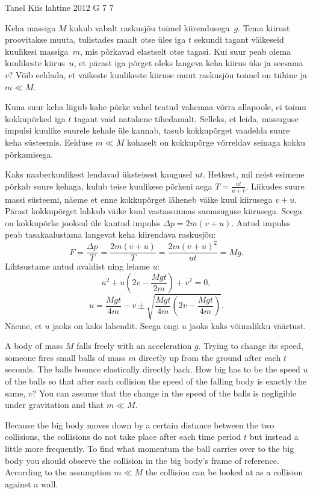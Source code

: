 {Tanel Kiis} %
{lahtine} %
{2012} %
{G 7} %
{7} %
{
\ifStatement
Keha massiga $M$ kukub vabalt raskusjõu toimel kiirendusega~$g$. Tema
kiirust proovitakse muuta, tulistades maalt otse üles iga $t$ sekundi tagant
väikeseid kuulikesi massiga~$m$, mis põrkavad elastselt otse tagasi.
Kui suur peab olema kuulikeste kiirus~$u$, et pärast iga põrget oleks langeva
keha kiirus üks ja seesama~$v$? Võib eeldada, et väikeste kuulikeste kiiruse muut raskusjõu toimel on
tühine ja $m\ll M$.
\fi


\ifHint
Kuna suur keha liigub kahe põrke vahel teatud vahemaa võrra allapoole, ei toimu kokkupõrked iga $t$ tagant vaid natukene tihedamalt. Selleks, et leida, missuguse impulsi kuulike suurele kehale üle kannab, tasub kokkupõrget vaadelda suure keha süsteemis. Eelduse $m\ll M$ kohaselt on kokkupõrge võrreldav seinaga kokku põrkamisega.
\fi


\ifSolution
Kaks naaberkuulikest lendavad üksteisest kaugusel $u t$. Hetkest, mil neist esimene põrkab suure kehaga, kulub teise kuulikese põrkeni aega $T=\frac{u t}{u+v}$.
Liikudes suure massi süsteemi, näeme et enne kokkupõrget läheneb väike kuul kiirusega $v + u$. Pärast kokkupõrget lahkub väike kuul vastassuunas samasuguse kiirusega. Seega on kokkupõrke jooksul üle kantud impulss $\Delta p = 2m(v + u)$. Antud impulss peab tasakaalustama langevat keha kiirendava raskusjõu: \[ F=\frac{\Delta p}{T}=\frac{2m(v + u)}{T} = \frac{2m(v + u)^2}{ut}=Mg. \]
Lihtsustame antud avaldist ning leiame $u$:
\[
u^2 + u\left( 2v - \frac{Mgt}{2m}\right) + v^2 = 0,
\]
\[
u = \frac{Mgt}{4m} - v \pm \sqrt{\frac{Mgt}{4m}\left( 2v - \frac{Mgt}{4m}\right)}.
\]
Näeme, et $u$ jaoks on kaks lahendit. Seega ongi $u$ jaoks kaks võimalikku väärtust.
\fi


\ifEngStatement
A body of mass $M$ falls freely with an acceleration $g$. Trying to change its speed, someone fires small balls of mass $m$ directly up from the ground after each $t$ seconds. The balls bounce elastically directly back. How big has to be the speed $u$ of the balls so that after each collision the speed of the falling body is exactly the same, $v$? You can assume that the change in the speed of the balls is negligible under gravitation and that $m\ll M$.
\fi


\ifEngHint
Because the big body moves down by a certain distance between the two collisions, the collisions do not take place after each time period $t$ but instead a little more frequently. To find what momentum the ball carries over to the big body you should observe the collision in the big body’s frame of reference. According to the assumption $m\ll M$ the collision can be looked at as a collision against a wall.
\fi


}
